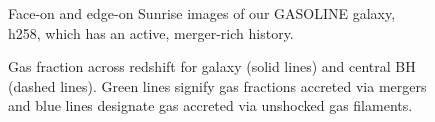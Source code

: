 \documentclass[manuscript]{aastex}
\begin{document}
\begin{figure}
\centerline{}
\caption[]{Face-on and edge-on Sunrise images of our GASOLINE galaxy, h258, which has an active, merger-rich history.}
\label{h258face} 
\end{figure}

\begin{figure}
\centerline{}
\caption[]{Gas fraction across redshift for galaxy (solid lines) and central BH (dashed lines). Green lines signify gas fractions accreted via mergers and blue lines designate gas accreted via unshocked gas filaments.}
\label{h258numfrac} 
\end{figure}
\end{document}
